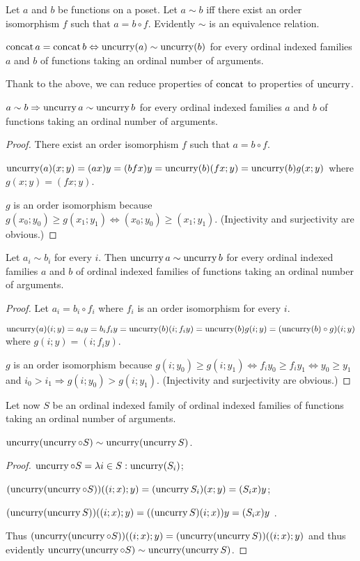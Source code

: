Let $a$ and $b$ be functions on a poset. Let $a\sim b$ iff there
exist an order isomorphism $f$ such that $a=b\circ f$. Evidently
$\sim$ is an equivalence relation.
\begin{obvious}
$\operatorname{concat} a=\operatorname{concat} b\Leftrightarrow\operatorname{uncurry}(a)\sim\operatorname{uncurry}(b)$ for
every ordinal indexed families $a$ and $b$ of functions taking an
ordinal number of arguments.
\end{obvious}
Thank to the above, we can reduce properties of $\operatorname{concat}$ to properties
of $\operatorname{uncurry}$.
\begin{lem}
$a\sim b\Rightarrow\operatorname{uncurry} a\sim\operatorname{uncurry} b$ for every ordinal indexed
families $a$ and $b$ of functions taking an ordinal number of arguments.\end{lem}
\begin{proof}
There exist an order isomorphism $f$ such that $a=b\circ f$.

$\operatorname{uncurry}(a)(x;y)=(ax)y=(bfx)y=\operatorname{uncurry}(b)(fx;y)=\operatorname{uncurry}(b)g(x;y)$
where $g(x;y)=(fx;y)$.

$g$ is an order isomorphism because $g(x_{0};y_{0})\ge g(x_{1};y_{1})\Leftrightarrow(x_{0};y_{0})\ge(x_{1};y_{1})$.
(Injectivity and surjectivity are obvious.)\end{proof}
\begin{lem}
\label{by-member}Let $a_{i}\sim b_{i}$ for every $i$. Then $\operatorname{uncurry} a\sim\operatorname{uncurry} b$
for every ordinal indexed families $a$ and $b$ of ordinal indexed
families of functions taking an ordinal number of arguments.\end{lem}
\begin{proof}
Let $a_{i}=b_{i}\circ f_{i}$ where $f_{i}$ is an order isomorphism
for every $i$.

$\operatorname{uncurry}(a)(i;y)=a_{i}y=b_{i}f_{i}y=\operatorname{uncurry}(b)(i;f_{i}y)=\operatorname{uncurry}(b)g(i;y)=(\operatorname{uncurry}(b)\circ g)(i;y)$
where $g(i;y)=(i;f_{i}y)$.

$g$ is an order isomorphism because $g(i;y_{0})\ge g(i;y_{1})\Leftrightarrow f_{i}y_{0}\ge f_{i}y_{1}\Leftrightarrow y_{0}\ge y_{1}$
and $i_{0}>i_{1}\Rightarrow g(i;y_{0})>g(i;y_{1})$. (Injectivity
and surjectivity are obvious.)
\end{proof}
Let now $S$ be an ordinal indexed family of ordinal indexed families
of functions taking an ordinal number of arguments.
\begin{lem}
$\operatorname{uncurry}(\operatorname{uncurry}\circ S)\sim\operatorname{uncurry}(\operatorname{uncurry} S)$.\end{lem}
\begin{proof}
$\operatorname{uncurry}\circ S=\lambda i\in S:\operatorname{uncurry}(S_{i})$;

$(\operatorname{uncurry}(\operatorname{uncurry}\circ S))((i;x);y)=(\operatorname{uncurry} S_{i})(x;y)=(S_{i}x)y$;

$(\operatorname{uncurry}(\operatorname{uncurry} S))((i;x);y)=((\operatorname{uncurry} S)(i;x))y=(S_{i}x)y$
.

Thus $(\operatorname{uncurry}(\operatorname{uncurry}\circ S))((i;x);y)=(\operatorname{uncurry}(\operatorname{uncurry} S))((i;x);y)$
and thus evidently $\operatorname{uncurry}(\operatorname{uncurry}\circ S)\sim\operatorname{uncurry}(\operatorname{uncurry} S)$.\end{proof}

